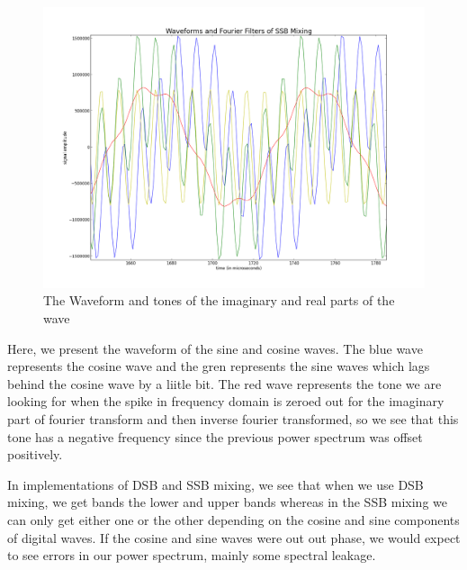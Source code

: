 \documentclass[12 pt]{article}
\begin{document}
\begin{figure}[H]
\center
\includegraphics[scale=0.4]{waveformssbdig.png}
\caption{The Waveform and tones of the imaginary and real parts of the wave}
\label{waveformssb}
\end{figure}

Here, we present the waveform of the sine and cosine waves. The blue
wave represents the cosine wave and the gren represents the sine waves
which lags behind the cosine wave by a liitle bit. The red wave
represents the tone we are looking for when the spike in frequency
domain is zeroed out for the imaginary part of fourier transform and
then inverse fourier transformed, so we see that this tone has a
negative frequency since the previous power spectrum was offset
positively. 

In implementations of DSB and SSB mixing, we see that when we use DSB
mixing,  we get bands the lower and upper bands whereas in the SSB
mixing we can only get either one or the other depending on the cosine
and sine components of digital waves. If the cosine and sine waves were
out out phase, we would expect to see errors in our power spectrum,
mainly some spectral leakage.
\end{document}
